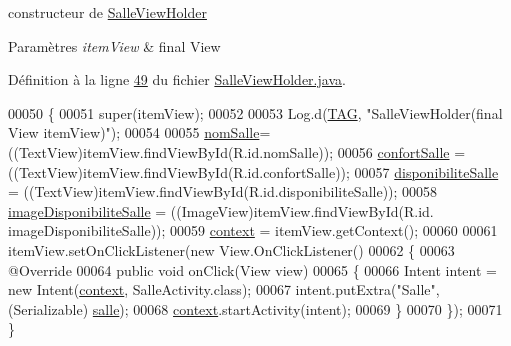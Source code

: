 constructeur de \hyperlink{classcom_1_1lasalle_1_1meeting_1_1_salle_view_holder}{Salle\+View\+Holder} 


\begin{DoxyParams}{Paramètres}
{\em item\+View} & final View \\
\hline
\end{DoxyParams}


Définition à la ligne \hyperlink{_salle_view_holder_8java_source_l00049}{49} du fichier \hyperlink{_salle_view_holder_8java_source}{Salle\+View\+Holder.\+java}.


\begin{DoxyCode}
00050     \{
00051         super(itemView);
00052 
00053         Log.d(\hyperlink{classcom_1_1lasalle_1_1meeting_1_1_salle_view_holder_acde5b16df12d2d83074c53bbfe7220b9}{TAG}, \textcolor{stringliteral}{"SalleViewHolder(final View itemView)"});
00054 
00055         \hyperlink{classcom_1_1lasalle_1_1meeting_1_1_salle_view_holder_a54d26a89113e63e36c17c4ed9253f058}{nomSalle}= ((TextView)itemView.findViewById(R.id.nomSalle));
00056         \hyperlink{classcom_1_1lasalle_1_1meeting_1_1_salle_view_holder_adb1ed56224bf4c72f3b6ceadd1e20da5}{confortSalle} = ((TextView)itemView.findViewById(R.id.confortSalle));
00057         \hyperlink{classcom_1_1lasalle_1_1meeting_1_1_salle_view_holder_a022ce4875ad260fe538779ae45fae90a}{disponibiliteSalle} = ((TextView)itemView.findViewById(R.id.disponibiliteSalle));
00058         \hyperlink{classcom_1_1lasalle_1_1meeting_1_1_salle_view_holder_aa062c074e992faadf2386744ea33034f}{imageDisponibiliteSalle} = ((ImageView)itemView.findViewById(R.id.
      imageDisponibiliteSalle));
00059         \hyperlink{classcom_1_1lasalle_1_1meeting_1_1_salle_view_holder_a7072e3d124129f260af7a24c7ad4277d}{context} = itemView.getContext();
00060 
00061         itemView.setOnClickListener(\textcolor{keyword}{new} View.OnClickListener()
00062         \{
00063             @Override
00064             \textcolor{keyword}{public} \textcolor{keywordtype}{void} onClick(View view)
00065             \{
00066                 Intent intent = \textcolor{keyword}{new} Intent(\hyperlink{classcom_1_1lasalle_1_1meeting_1_1_salle_view_holder_a7072e3d124129f260af7a24c7ad4277d}{context}, SalleActivity.class);
00067                 intent.putExtra(\textcolor{stringliteral}{"Salle"}, (Serializable) \hyperlink{classcom_1_1lasalle_1_1meeting_1_1_salle_view_holder_afe85265c9d35c5035e96ace9c8032606}{salle});
00068                 \hyperlink{classcom_1_1lasalle_1_1meeting_1_1_salle_view_holder_a7072e3d124129f260af7a24c7ad4277d}{context}.startActivity(intent);
00069             \}
00070         \});
00071     \}
\end{DoxyCode}


